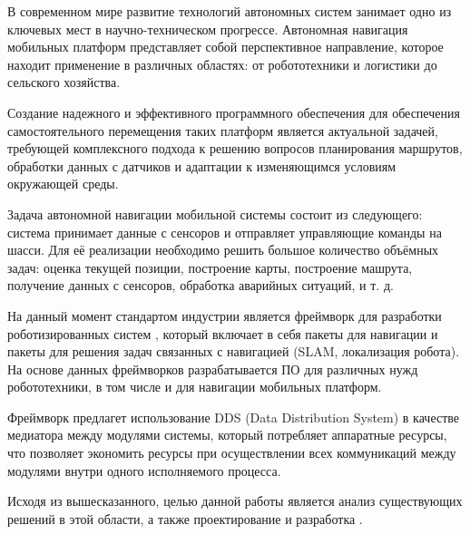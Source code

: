 \label{sec:intro}

В современном мире развитие технологий автономных систем занимает одно из
ключевых мест в научно-техническом прогрессе. Автономная навигация мобильных
платформ представляет собой перспективное направление, которое находит
применение в различных областях: от робототехники и логистики до сельского
хозяйства.

Создание надежного и эффективного программного обеспечения для обеспечения
самостоятельного перемещения таких платформ является актуальной задачей,
требующей комплексного подхода к решению вопросов планирования маршрутов,
обработки данных с датчиков и адаптации к изменяющимся условиям окружающей
среды.

Задача автономной навигации мобильной системы состоит из следующего: система
принимает данные с сенсоров и отправляет управляющие команды на шасси. Для её
реализации необходимо решить большое количество объёмных задач: оценка текущей
позиции, построение карты, построение машрута, получение данных с сенсоров,
обработка аварийных ситуаций, и т. д.

На данный момент стандартом индустрии является фреймворк для разработки
роботизированных систем \ros, который включает в себя пакеты для навигации и
пакеты для решения задач связанных с навигацией (SLAM, локализация робота).
На основе данных фреймворков разрабатывается ПО для различных нужд
робототехники, в том числе и для навигации мобильных платформ. 

Фреймворк предлагет использование DDS (Data Distribution System) в качестве
медиатора между модулями системы, который потребляет аппаратные ресурсы,
что позволяет экономить ресурсы при осуществлении всех коммуникаций между
модулями внутри одного исполняемого процесса.

Исходя из вышесказанного, целью данной работы является анализ существующих
решений в этой области, а также проектирование и разработка
\diplomanameR.
